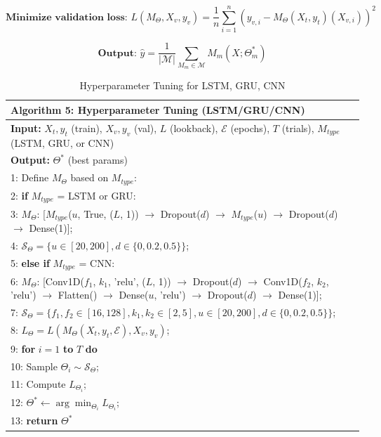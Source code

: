 \begin{equation}
\textbf{Minimize validation loss: } L(M_\Theta, X_v, y_v) = \frac{1}{n} \sum_{i=1}^{n} (y_{v,i} - M_\Theta(X_t, y_t)(X_{v,i}))^2
\label{math_minimize_validation_loss}
\end{equation}

\begin{equation}
\textbf{Output: } \hat{y} = \frac{1}{|\mathcal{M}|} \sum_{M_m \in \mathcal{M}} M_m(X; \Theta_m^*)
\label{math_dl_output}
\end{equation}

\begin{table}[h]
\small
\centering
\begin{tabular}{|p{14cm}|}
\hline
\textbf{Algorithm 5: Hyperparameter Tuning (LSTM/GRU/CNN)} \\
\hline
\textbf{Input:} $X_t, y_t$ (train), $X_v, y_v$ (val), $L$ (lookback), $\mathcal{E}$ (epochs), $T$ (trials), $M_{type}$ (LSTM, GRU, or CNN) \\
\textbf{Output:} $\Theta^*$ (best params) \\
\hline
1: Define $M_\Theta$ based on $M_{type}$: \\
2: \quad \textbf{if} $M_{type}$ = LSTM or GRU: \\
3: \quad\quad $M_\Theta$: [$M_{type}$($u$, True, ($L$, 1)) $\rightarrow$ Dropout($d$) $\rightarrow$ $M_{type}$($u$) $\rightarrow$ Dropout($d$) $\rightarrow$ Dense(1)]; \\
4: \quad\quad $\mathcal{S}_\Theta = \{ u \in [20, 200], d \in \{0, 0.2, 0.5\} \}$; \\
5: \quad \textbf{else if} $M_{type}$ = CNN: \\
6: \quad\quad $M_\Theta$: [Conv1D($f_1$, $k_1$, 'relu', ($L$, 1)) $\rightarrow$ Dropout($d$) $\rightarrow$ Conv1D($f_2$, $k_2$, 'relu') $\rightarrow$ Flatten() $\rightarrow$ Dense($u$, 'relu') $\rightarrow$ Dropout($d$) $\rightarrow$ Dense(1)]; \\
7: \quad\quad $\mathcal{S}_\Theta = \{ f_1, f_2 \in [16, 128], k_1, k_2 \in [2, 5], u \in [20, 200], d \in \{0, 0.2, 0.5\} \}$; \\
8: \quad $L_\Theta = L(M_\Theta(X_t, y_t, \mathcal{E}), X_v, y_v)$; \\
9: \textbf{for} $i = 1$ \textbf{to} $T$ \textbf{do} \\
10: \quad Sample $\Theta_i \sim \mathcal{S}_\Theta$; \\
11: \quad Compute $L_{\Theta_i}$; \\
12: $\Theta^* \leftarrow \arg\min_{\Theta_i} L_{\Theta_i}$; \\
13: \textbf{return} $\Theta^*$ \\
\hline
\end{tabular}


\caption{Hyperparameter Tuning for LSTM, GRU, CNN}
\label{tab:dynamic_dl_tuner}
\end{table}
